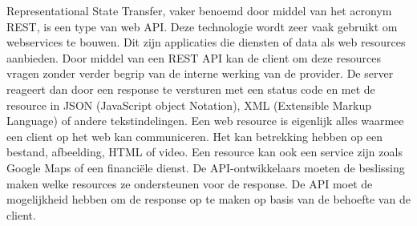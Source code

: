 Representational State Transfer, vaker benoemd door middel van het acronym REST, is een type van web API. Deze technologie wordt zeer vaak gebruikt om webservices te bouwen.
Dit zijn applicaties die diensten of data als web resources aanbieden. Door middel van een REST API kan de client om deze resources vragen zonder verder
begrip van de interne werking van de provider. De server reageert dan door een response te versturen met een status code en met de resource in JSON (JavaScript object Notation),
XML (Extensible Markup Language) of andere tekstindelingen. Een web resource is eigenlijk alles waarmee een client op het web kan communiceren.
Het kan betrekking hebben op een bestand, afbeelding, HTML of video. Een resource kan ook een service zijn zoals Google Maps of een financiële dienst.
De API-ontwikkelaars moeten de beslissing maken welke resources ze ondersteunen voor de response. De API moet de mogelijkheid hebben om de response op te maken op basis van de behoefte van de client.
~\autocite{uptrends}
~\autocite{guru99-webservices}\\

